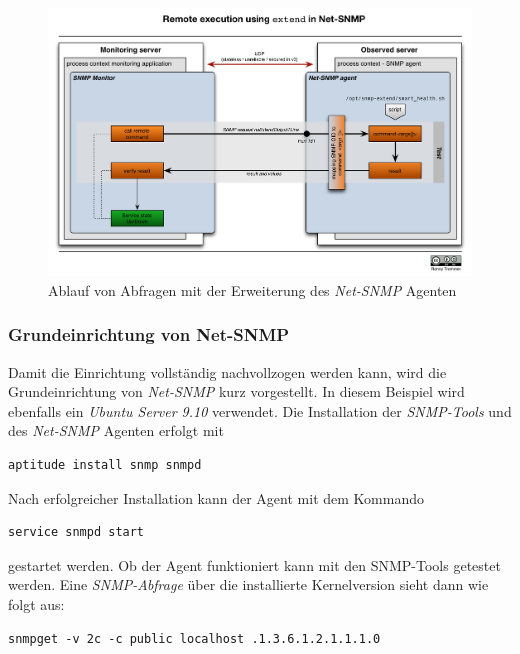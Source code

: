 \begin{figure}[H]
	\centering
	\includegraphics[width=1.0\textwidth]{images/use-cases/script-extending-linux/flow-netsnmp}
	\caption{Ablauf von Abfragen mit der Erweiterung des \emph{Net-SNMP} Agenten}
	\label{pic:flow-netsnmp}
\end{figure}

\subsubsection{Grundeinrichtung von Net-SNMP}
Damit die Einrichtung vollständig nachvollzogen werden kann, wird die Grundeinrichtung von \emph{Net-SNMP} kurz vorgestellt. In diesem Beispiel wird ebenfalls ein \emph{Ubuntu Server 9.10} verwendet. Die Installation der \emph{SNMP-Tools} und des \emph{Net-SNMP} Agenten erfolgt mit

\begin{lstlisting}[numbers=none]
aptitude install snmp snmpd
\end{lstlisting}

Nach erfolgreicher Installation kann der Agent mit dem Kommando

\begin{lstlisting}[numbers=none]
service snmpd start
\end{lstlisting}

gestartet werden. Ob der Agent funktioniert kann mit den SNMP-Tools getestet werden. Eine \emph{SNMP-Abfrage} über die installierte Kernelversion sieht dann wie folgt aus:

\begin{lstlisting}[numbers=none]
snmpget -v 2c -c public localhost .1.3.6.1.2.1.1.1.0
\end{lstlisting}

